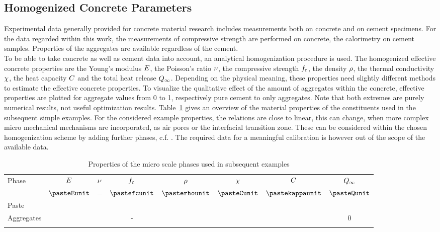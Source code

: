 \subsection{Homogenized Concrete Parameters}
Experimental data generally provided for concrete material research includes measurements both on concrete and on cement specimens.
For the data regarded within this work, the measurements of compressive strength are performed on concrete, the calorimetry on cement samples.
Properties of the aggregates are available regardless of the cement.\\

To be able to take concrete as well as cement data into account, an analytical homogenization procedure is used.
The homogenized effective concrete properties are the Young's modulus $E$, the Poisson's ratio $\nu$, the compressive strength $f_{\text{c}}$, the density $\rho$, the thermal conductivity $\chi$, the heat capacity $C$ and the total heat release $Q_{\infty}$.
Depending on the physical meaning, these properties need slightly different methods to estimate the effective concrete properties.
To visualize the qualitative effect of the amount of aggregates within the concrete, effective properties are plotted for aggregate values from 0 to 1, respectively pure cement to only aggregates.
Note that both extremes are purely numerical results, not useful optimization results.
\mbox{Table \ref{tab:homogenizationproperties}} gives an overview of the material properties of the constituents used in the subsequent simple examples.
For the considered example properties, the relations are close to linear, this can change, when more complex micro mechanical mechanisms are incorporated, as air pores or the interfacial transition zone.
These can be considered within the chosen homogenization scheme by adding further phases, c.f. \cite{nee_2012_ammf}.
The required data for a meaningful calibration is however out of the scope of the available data.
\begin{table}[ht]
	\begin{center}
		\begin{minipage}{.9\textwidth}
			\caption{Properties of the micro scale phases used in subsequent examples}\label{tab:homogenizationproperties}
			\begin{tabular}{lccccccc}
				\toprule
				Phase & $E$ & $\nu$ & $f_{\text{c}}$ & $\rho$ & $\chi$ & $C$ & $Q_{\infty}$\\
				  & $\pasteEunit$  & $-$  & $\pastefcunit$  & $\pasterhounit$  & $\pasteCunit$  & $\pastekappaunit$  &  $\pasteQunit$ \\
				\midrule
			Paste	& \pasteE & \pastenu & \pastefc & \pasterho & \pasteC & \pastekappa &  \pasteQ \\
			Aggregates	& \aggregatesE & \aggregatesnu & - & \aggregatesrho & \aggregatesC & \aggregateskappa &  0 \\
				\botrule
			\end{tabular}
		\end{minipage}
	\end{center}
		
\end{table}
